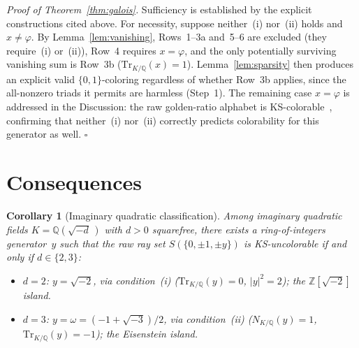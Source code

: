 \documentclass[12pt,a4paper]{article}
\newtheorem{corollary}{Corollary}
\newcommand{\Z}{\mathbb{Z}}
\newcommand{\Q}{\mathbb{Q}}
\newcommand{\Norm}[1]{N_{K/\Q}\!\left(#1\right)}
\newcommand{\Tr}[1]{\mathrm{Tr}_{K/\Q}\!\left(#1\right)}
\begin{document}
\noindent\textit{Proof of Theorem~\ref{thm:galois}.}
Sufficiency is established by the explicit constructions cited above.
For necessity, suppose neither~(i) nor~(ii) holds and $x \neq \varphi$.
By Lemma~\ref{lem:vanishing}, Rows~1--3a and~5--6 are excluded
(they require~(i) or~(ii)), Row~4 requires $x = \varphi$, and the
only potentially surviving vanishing sum is Row~3b ($\Tr{x} = 1$).
Lemma~\ref{lem:sparsity} then produces an explicit valid
$\{0,1\}$-coloring regardless of whether Row~3b applies, since
the all-nonzero triads it permits are harmless (Step~1).
The remaining case $x = \varphi$ is
addressed in the Discussion: the raw golden-ratio alphabet
is KS-colorable~\cite{Kernaghan2026islands}, confirming that
neither~(i) nor~(ii) correctly predicts colorability for this
generator as well.
\hfill$\square$

\section{Consequences}\label{sec:consequences}

\begin{corollary}[Imaginary quadratic classification]\label{cor:imagquad}
Among imaginary quadratic fields $K = \Q(\sqrt{-d}\,)$ with $d > 0$
squarefree, there exists a ring-of-integers generator~$y$ such that
the raw ray set $S(\{0, \pm 1, \pm y\})$ is KS-uncolorable if and only
if $d \in \{2, 3\}$:
\begin{itemize}
\item $d = 2$: $y = \sqrt{-2}$, via condition~(i) ($\Tr{y} = 0$,
  $|y|^2 = 2$); the $\Z[\sqrt{-2}]$ island.
\item $d = 3$: $y = \omega = (-1{+}\sqrt{-3})/2$, via condition~(ii)
  ($\Norm{y} = 1$, $\Tr{y} = -1$); the Eisenstein island.
\end{itemize}
\end{corollary}
\end{document}
